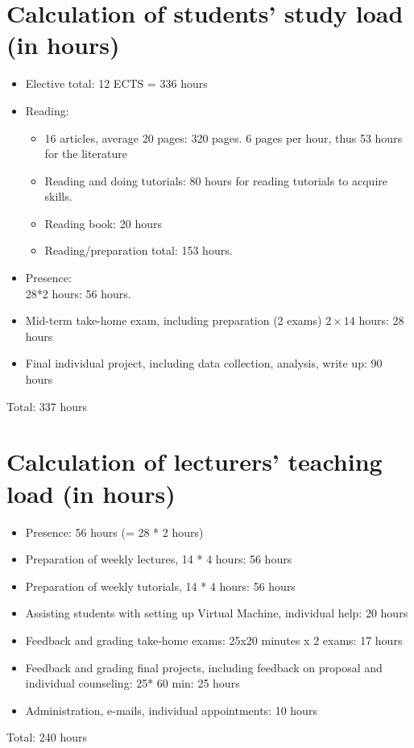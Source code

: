 \documentclass[a4paper,12pt]{report}
\begin{document}
\chapter{Calculation of students' study load (in hours)}
\begin{itemize}

\item Elective total: 12 ECTS = 336 hours
\item Reading: 
\begin{itemize}
\item 16 articles, average 20 pages: 320 pages. 6 pages per hour, thus 53 hours for the literature
\item Reading and doing tutorials: 80 hours for reading tutorials to acquire skills.
\item Reading book: 20 hours
\item Reading/preparation total: 153 hours.
\end{itemize}
\item Presence: \\28*2 hours: 56 hours.
\item Mid-term take-home exam, including preparation (2 exams) $2 \times 14$ hours: 28 hours
\item Final individual project, including data collection, analysis, write up: 90 hours
\end{itemize}

Total: 337 hours



\chapter{Calculation of lecturers' teaching load (in hours)}
\begin{itemize}
\item Presence: 56 hours (= 28 * 2 hours)
\item Preparation of weekly lectures, 14 * 4 hours: 56 hours
\item Preparation of weekly tutorials, 14 * 4 hours: 56 hours
\item Assisting students with setting up Virtual Machine, individual help: 20 hours
\item Feedback and grading take-home exams: 25x20 minutes x 2 exams: 17 hours
\item Feedback and grading final projects, including feedback on proposal and individual counseling: 25* 60 min: 25 hours 
\item Administration, e-mails, individual appointments: 10 hours
\end{itemize}
Total: 240 hours
\end{document}
